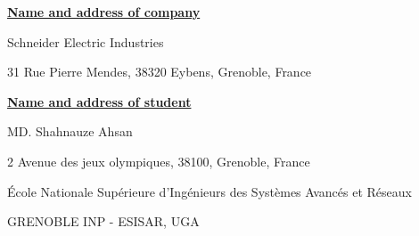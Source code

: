 \begin{titlepage}
\begin{center}
\vspace{2\baselineskip}
    {\large \bfseries \underline {Name and address of company} \par}
\vspace{\baselineskip}
      {\large {Schneider Electric Industries} \par}
        {\large {31 Rue Pierre Mendes, 38320 Eybens, Grenoble, France} \par}
        
\vspace{2\baselineskip}
    {\large \bfseries \underline {Name and address of student} \par}
  \vspace{\baselineskip}
      {\large {MD. Shahnauze Ahsan} \par}
        {\large {2 Avenue des jeux olympiques, 38100, Grenoble, France} \par}

\vspace{2\baselineskip}
    \par
    \par
    \par
   \par


   


\vspace{2\baselineskip}
 {{École Nationale Supérieure d'Ingénieurs des Systèmes Avancés et Réseaux}\par}
    { \MakeUppercase{Grenoble INP - Esisar, UGA} \par}

 \end{center}


\end{titlepage}